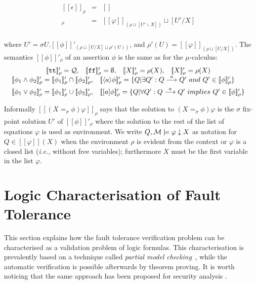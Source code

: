 \documentclass{entcs}
\newcommand{\ie}{\emph{i.e., }}
\newcommand{\dia}[1]{\langle #1 \rangle}
\newcommand{\arco}[1]{\stackrel{#1}{\longrightarrow}}
\newcommand{\sem}[1]{[\![#1]\!]}
\newcommand{\ct}[1]{{\cal #1}}
\newcommand{\ltsQ}{\mathcal{Q}}
\newcommand{\ltsq}{Q}
\newcommand{\true}{\mathtt {tt}}
\newcommand{\false}{\mathtt {ff}}
\begin{document}
$$
\begin{array}{rcl}
\sem{\epsilon}_{\rho}& = & []\\
\sem{(X =_{\sigma} \phi) \varphi}_{\rho} & = &
\sem{\varphi}_{(\rho\sqcup [U'\backslash X])}\sqcup [U'\slash X] \\[2ex]
\end{array}
$$%

where $U'  =  \sigma U.\sem{\phi}'_{(\rho\sqcup [U\slash X]\sqcup
  \rho'(U))}$, and $\rho'(U)  =  \sem{\varphi}_{(\rho\sqcup [U\slash X])}$.
The semantics $\sem{\phi}'_{\rho}$ of an assertion $\phi$ is the
same as for the $\mu$-calculus:%
$$
\begin{array}{c}
\begin{array}{l@{,\quad}l@{,\quad}l@{,\quad}l}
\sem{\true}'_{\rho} = \ltsQ &
\sem{\false}'_{\rho} = \emptyset &
\sem{X}'_{\rho} = \rho(X) &
\sem{X}'_{\rho} = \rho(X)
\end{array}  \\
 \begin{array}{l@{,\quad}l}
\sem{\phi_{1}\wedge \phi_{2}}'_{\rho} = \sem{\phi_{1}}'_{\rho}\cap \sem{\phi_{2}}'_{\rho} &
\sem{\dia{a}\phi}'_{\rho} =
\{Q|\exists Q':Q\arco{a} Q'{\rm\ and\ }
Q'\in \sem{\phi}'_{\rho}\}
\\[1ex]
\sem{\phi_{1}\vee \phi_{2}}'_{\rho} = \sem{\phi_{1}}'_{\rho}\cup
\sem{\phi_{2}}'_{\rho}&
\sem{[a]\phi}'_{\rho} =
\{Q|\forall Q':Q\arco{a} Q'{\rm \ implies\ }
Q'\in\sem{\phi}'_{\rho}\}
\end{array}
\end{array}
$$

Informally $\sem{(X =_{\sigma} \phi) \varphi}_{\rho}$ says that the solution
to $(X=_{\sigma} \phi) \varphi$ is the $\sigma$ fix-point solution $U'$ of
$\sem{\phi}'_{\rho}$ where the solution to the rest of the list of equations
$\varphi$ is used as environment.  We write $\ltsq, \ct{M}\models \varphi
\downarrow X$ as notation for $\ltsq \in \sem{\varphi}(X)$ when the
environment $\rho$ is evident from the context or $\varphi$ is a closed list
(\ie without free variables); furthermore $X$ must be the first variable in
the list $\varphi$.


\section{Logic Characterisation of Fault Tolerance}
\label{logicchar:sec}%

This section explains how the fault tolerance verification problem can be
characterised as a validation problem of logic formulas. This
characterisation is prevalently based on a technique called \emph{partial
  model checking}~\cite{LICS::Andersen1995}, while the automatic verification is
possible afterwards by theorem proving. It is worth noticing that the same
approach has been proposed for security analysis \cite{M98:csfw,fabiosos}.
\end{document}
